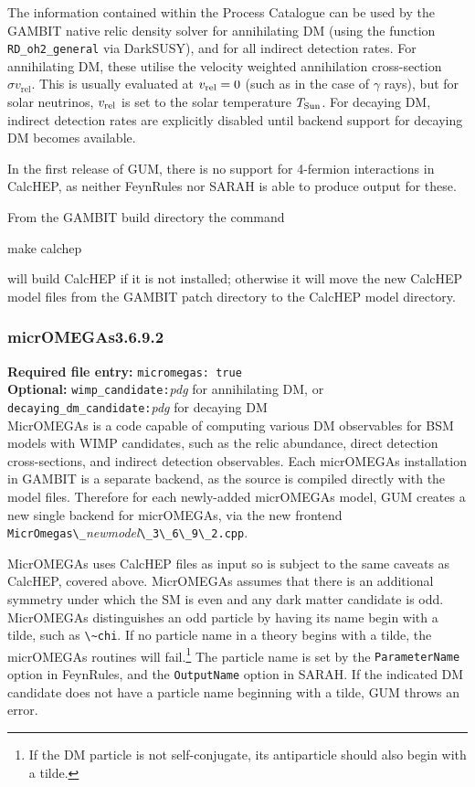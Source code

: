 \documentclass[pdftex,twocolumn,epjc3_preprint,runningheads]{svjour3}
\renewcommand{\_}{\discretionary{\underscore}{}{\underscore}}
\newcommand\cpp[1]{{\lstinline!#1!}}  %
\newcommand\term[1]{{\lstset{style=terminal}\lstinline!#1!\lstset{style=cpp}}}
\newcommand\mathematica[1]{{\lstset{style=Mathematica}\lstinline!#1!\lstset{style=cpp}}}
\newcommand\guminline[1]{{{\lstset{style=gum}\lstinline!#1!}}}
\newcommand{\metavarf}[1]{\textit{\color{darkgreen}\footnotesize\textrm{#1}}}
\newcommand{\metavar}{\metavarf}
\newcommand{\gambit}{\textsf{GAMBIT}\xspace}
\newcommand{\GB}{\gambit}
\newcommand{\ds}{\textsf{DarkSUSY}\xspace}
\newcommand{\darksusy}{\ds}
\newcommand{\mo}{\micromegas}
\newcommand{\micromegas}{\textsf{micrOMEGAs}\xspace}
\newcommand{\gum}{\textsf{GUM}\xspace}
\newcommand{\dgum}{\!\!\term{.gum}\!\xspace}
\newcommand{\fr}{\textsf{FeynRules}\xspace}
\newcommand{\sarah}{\textsf{SARAH}\xspace}
\newcommand{\CH}{\textsf{CalcHEP}\xspace}
\newcommand{\nm}{\metavar{new\_model}}
\begin{document}
The information contained within the Process Catalogue can be used by the \GB native relic density solver for annihilating DM (using the function \cpp{RD_oh2_general} via \darksusy), and for all indirect detection rates.  For annihilating DM, these utilise the velocity weighted annihilation cross-section $\sigma v_\text{rel}$. This is usually evaluated at $v_{\rm{rel}}=0$ (such as in the case of $\gamma$ rays), but for solar neutrinos, $v_{\rm{rel}}$ is set to the solar temperature $T_{\rm{Sun}}$.  For decaying DM, indirect detection rates are explicitly disabled until backend support for decaying DM becomes available.

In the first release of \gum, there is no support for 4-fermion interactions in \CH, as neither \fr nor \sarah is able to produce output for these.

From the \GB build directory the command
%
\begin{lstterm}
make calchep
\end{lstterm}
%
will build \CH if it is not installed; otherwise it will move the new \CH model files from the \GB patch directory to the \CH model directory.

\subsubsection{\micromegas \textsf{3.6.9.2}}

\textbf{Required \dgum file entry:} \guminline{micromegas: true}\\
\textbf{Optional:} \guminline{wimp_candidate:}\metavar{pdg} for annihilating DM, or  \guminline{decaying_dm_candidate:}\metavar{pdg} for decaying DM \\


\textsf{MicrOMEGAs} is a code capable of computing various DM observables for BSM models with WIMP candidates, such as the relic abundance, direct detection cross-sections, and indirect detection observables. Each \mo installation in \GB is a separate backend, as the source is compiled directly with the model files. Therefore for each newly-added \mo model, \gum creates a new single backend for \mo, via the new frontend \term{MicrOmegas\_}\nm\term{\_3\_6\_9\_2.cpp}.

\textsf{MicrOMEGAs} uses \CH files as input so is subject to the same caveats as \CH, covered above. \textsf{MicrOMEGAs} assumes that there is an additional symmetry under which the SM is even and any dark matter candidate is odd. \textsf{MicrOMEGAs} distinguishes an odd particle by having its name begin with a tilde, such as \mathematica{\~chi}. If no particle name in a theory begins with a tilde, the \mo routines will fail.\footnote{If the DM particle is not self-conjugate, its antiparticle should also begin with a tilde.} The particle name is set by the \mathematica{ParameterName} option in \fr, and the \mathematica{OutputName} option in \sarah. If the indicated DM candidate does not have a particle name beginning with a tilde, \gum throws an error.
\end{document}
